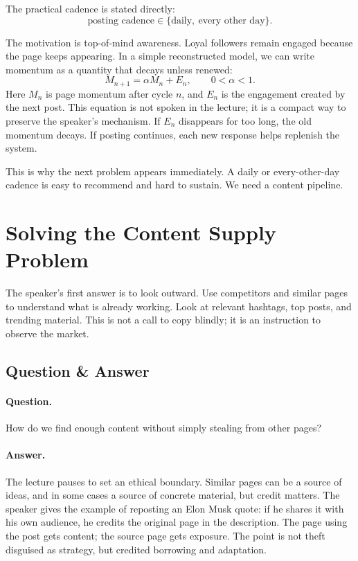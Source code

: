 The practical cadence is stated directly:
\begin{equation}
\text{posting cadence} \in
\{\text{daily},\ \text{every other day}\}.
\end{equation}

The motivation is top-of-mind awareness. Loyal followers remain engaged because the page keeps appearing. In a simple reconstructed model, we can write momentum as a quantity that decays unless renewed:
\begin{equation}
M_{n+1}
=
\alpha M_n + E_n,
\qquad 0 < \alpha < 1.
\end{equation}
Here $M_n$ is page momentum after cycle $n$, and $E_n$ is the engagement created by the next post. This equation is not spoken in the lecture; it is a compact way to preserve the speaker's mechanism. If $E_n$ disappears for too long, the old momentum decays. If posting continues, each new response helps replenish the system.

This is why the next problem appears immediately. A daily or every-other-day cadence is easy to recommend and hard to sustain. We need a content pipeline.

\section{Solving the Content Supply Problem}

The speaker's first answer is to look outward. Use competitors and similar pages to understand what is already working. Look at relevant hashtags, top posts, and trending material. This is not a call to copy blindly; it is an instruction to observe the market.

\subsection{Question \& Answer}

\paragraph{Question.}
How do we find enough content without simply stealing from other pages?

\paragraph{Answer.}
The lecture pauses to set an ethical boundary. Similar pages can be a source of ideas, and in some cases a source of concrete material, but credit matters. The speaker gives the example of reposting an Elon Musk quote: if he shares it with his own audience, he credits the original page in the description. The page using the post gets content; the source page gets exposure. The point is not theft disguised as strategy, but credited borrowing and adaptation.

